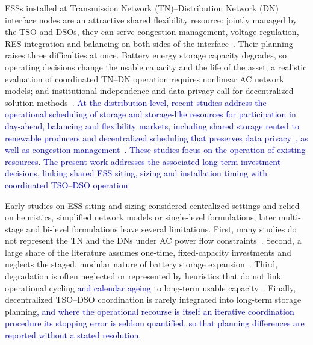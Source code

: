 \documentclass[preprint,12pt]{elsarticle}
\begin{document}
ESSs installed at Transmission Network (TN)--Distribution Network (DN) interface nodes are an attractive shared flexibility resource: jointly managed by the TSO and DSOs, they can serve congestion management, voltage regulation, RES integration and balancing on both sides of the interface~\cite{simoes_2025}. 
Their planning raises three difficulties at once. Battery energy storage capacity degrades, so operating decisions change the usable capacity and the life of the asset; a realistic evaluation of coordinated TN--DN operation requires nonlinear AC network models; and institutional independence and data privacy call for decentralized solution methods~\cite{capitanescu_2016,usman_2023}. 
\textcolor{blue}{
    At the distribution level, recent studies address the operational scheduling of storage and storage-like resources for participation in day-ahead, balancing and flexibility markets, including shared storage rented to renewable producers and decentralized scheduling that preserves data privacy~\cite{aghdam_2025}, as well as congestion management~\cite{aghdam_2023,aghdam_2024}. These studies focus on the operation of existing resources. The present work addresses the associated long-term investment decisions, linking shared ESS siting, sizing and installation timing with coordinated TSO--DSO operation.
}

Early studies on ESS siting and sizing considered centralized settings and relied on heuristics, simplified network models or single-level formulations; later multi-stage and bi-level formulations leave several limitations.
First, many studies do not represent the TN and the DNs under AC power flow constraints~\cite{massucco_2021,hassan_2018,feng_2025,najibi_2021,nawaz_2021,papalexopoulos_2020,bragin_2022,qiu_2017}.
Second, a large share of the literature assumes one-time, fixed-capacity investments and neglects the staged, modular nature of battery storage expansion~\cite{pandzic_2015,liu_2016,li_2015,bayram_2017,zhang_2013,hedayati_2014,konstantelos_2015}.
Third, degradation is often neglected or represented by heuristics that do not link operational cycling \textcolor{blue}{and calendar ageing} to long-term usable capacity~\cite{liu_2016,li_2015,bayram_2017,zhang_2013,hedayati_2014,konstantelos_2015,nasrolahpour_2016,xu_2017,motalleb_2016,feng_2025,pandzic_2015,fortenbacher_2016,nick_2018}.
Finally, decentralized TSO--DSO coordination is rarely integrated into long-term storage planning\textcolor{blue}{, and where the operational recourse is itself an iterative coordination procedure its stopping error is seldom quantified, so that planning differences are reported without a stated resolution}.
\end{document}
